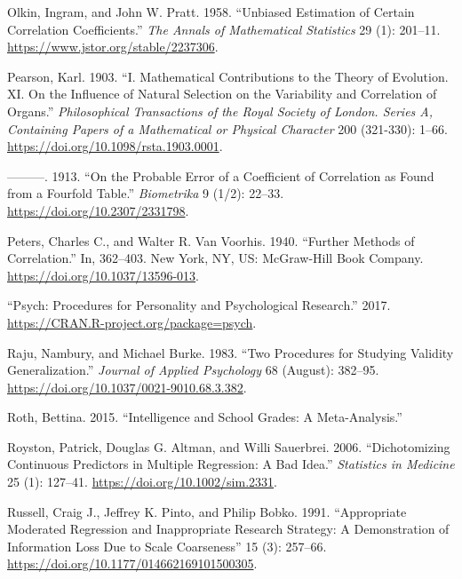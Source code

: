 \documentclass[
  letterpaper,
  DIV=11,
  numbers=noendperiod]{scrreprt}
\newlength{\cslhangindent}
\newlength{\cslentryspacingunit} %
\newenvironment{CSLReferences}[2] %
 {%
  \setlength{\parindent}{0pt}
  \ifodd #1
  \let\oldpar\par
  \def\par{\hangindent=\cslhangindent\oldpar}
  \fi
  \setlength{\parskip}{#2\cslentryspacingunit}
 }%
 {}
\begin{document}
\begin{CSLReferences}{1}{0}
\leavevmode{}%
Olkin, Ingram, and John W. Pratt. 1958. {``Unbiased Estimation of
Certain Correlation Coefficients.''} \emph{The Annals of Mathematical
Statistics} 29 (1): 201--11. \url{https://www.jstor.org/stable/2237306}.

\leavevmode{}%
Pearson, Karl. 1903. {``I. Mathematical Contributions to the Theory of
Evolution. {\textemdash}XI. On the Influence of Natural Selection on the
Variability and Correlation of Organs.''} \emph{Philosophical
Transactions of the Royal Society of London. Series A, Containing Papers
of a Mathematical or Physical Character} 200 (321-330): 1--66.
\url{https://doi.org/10.1098/rsta.1903.0001}.

\leavevmode{}%
---------. 1913. {``On the Probable Error of a Coefficient of
Correlation as Found from a Fourfold Table.''} \emph{Biometrika} 9
(1/2): 22--33. \url{https://doi.org/10.2307/2331798}.

\leavevmode{}%
Peters, Charles C., and Walter R. Van Voorhis. 1940. {``Further Methods
of Correlation.''} In, 362--403. New York, NY, US: McGraw-Hill Book
Company. \url{https://doi.org/10.1037/13596-013}.

\leavevmode{}%
{``Psych: Procedures for Personality and Psychological Research.''}
2017. \url{https://CRAN.R-project.org/package=psych}.

\leavevmode{}%
Raju, Nambury, and Michael Burke. 1983. {``Two Procedures for Studying
Validity Generalization.''} \emph{Journal of Applied Psychology} 68
(August): 382--95. \url{https://doi.org/10.1037/0021-9010.68.3.382}.

\leavevmode{}%
Roth, Bettina. 2015. {``Intelligence and School Grades: A
Meta-Analysis.''}

\leavevmode{}%
Royston, Patrick, Douglas G. Altman, and Willi Sauerbrei. 2006.
{``Dichotomizing Continuous Predictors in Multiple Regression: A Bad
Idea.''} \emph{Statistics in Medicine} 25 (1): 127--41.
\url{https://doi.org/10.1002/sim.2331}.

\leavevmode{}%
Russell, Craig J., Jeffrey K. Pinto, and Philip Bobko. 1991.
{``Appropriate Moderated Regression and Inappropriate Research Strategy:
A Demonstration of Information Loss Due to Scale Coarseness''} 15 (3):
257--66. \url{https://doi.org/10.1177/014662169101500305}.


\end{CSLReferences}
\end{document}
